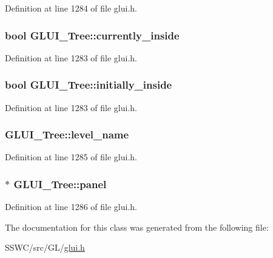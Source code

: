 Definition at line 1284 of file glui.\+h.

\hypertarget{class_g_l_u_i___tree_ab8c9cfc5885edf05eb1d516e61ebd7dc}{
\subsubsection[{currently\+\_\+inside}]{\setlength{\rightskip}{0pt plus 5cm}bool G\+L\+U\+I\+\_\+\+Tree\+::currently\+\_\+inside}}\label{class_g_l_u_i___tree_ab8c9cfc5885edf05eb1d516e61ebd7dc}


Definition at line 1283 of file glui.\+h.

\hypertarget{class_g_l_u_i___tree_a920c5916bd08173bd22043e1f31b85d5}{
\subsubsection[{initially\+\_\+inside}]{\setlength{\rightskip}{0pt plus 5cm}bool G\+L\+U\+I\+\_\+\+Tree\+::initially\+\_\+inside}}\label{class_g_l_u_i___tree_a920c5916bd08173bd22043e1f31b85d5}


Definition at line 1283 of file glui.\+h.

\hypertarget{class_g_l_u_i___tree_a4047a0265f95953a1a029ec0f3dda5c3}{
\subsubsection[{level\+\_\+name}]{ G\+L\+U\+I\+\_\+\+Tree\+::level\+\_\+name}}\label{class_g_l_u_i___tree_a4047a0265f95953a1a029ec0f3dda5c3}


Definition at line 1285 of file glui.\+h.

\hypertarget{class_g_l_u_i___tree_a4ba552062c7dfae187a9d346f8b42f08}{
\subsubsection[{panel}]{$\ast$ G\+L\+U\+I\+\_\+\+Tree\+::panel}}\label{class_g_l_u_i___tree_a4ba552062c7dfae187a9d346f8b42f08}


Definition at line 1286 of file glui.\+h.



The documentation for this class was generated from the following file\+:\begin{DoxyCompactItemize}
\item 
S\+S\+W\+C/src/\+G\+L/\hyperlink{glui_8h}{glui.\+h}\end{DoxyCompactItemize}
